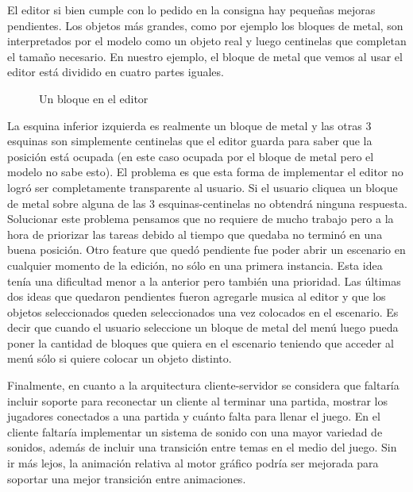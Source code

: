 \documentclass[a4paper]{article}
\begin{document}
El editor si bien cumple con lo pedido en la consigna hay pequeñas mejoras pendientes. Los objetos más grandes, como por ejemplo los bloques de metal, son interpretados por el modelo como un objeto real y luego centinelas que completan el tamaño necesario. En nuestro ejemplo, el bloque de metal que vemos al usar el editor está dividido en cuatro partes iguales.

\begin{figure}[!h]
	\caption{Un bloque en el editor}
	\label{fig:diagrama1}
\end{figure}

La esquina inferior izquierda es realmente un bloque de metal y las otras 3 esquinas son simplemente centinelas que el editor guarda para saber que la posición está ocupada (en este caso ocupada por el bloque de metal pero el modelo no sabe esto). El problema es que esta forma de implementar el editor no logró ser completamente transparente al usuario. Si el usuario cliquea un bloque de metal sobre alguna de las 3 esquinas-centinelas no obtendrá ninguna respuesta. Solucionar este problema pensamos que no requiere de mucho trabajo pero a la hora de priorizar las tareas debido al tiempo que quedaba no terminó en una buena posición. 
Otro feature que quedó pendiente fue poder abrir un escenario en cualquier momento de la edición, no sólo en una primera instancia. Esta idea tenía una dificultad menor a la anterior pero también una prioridad.
Las últimas dos ideas que quedaron pendientes fueron agregarle musica al editor y que los objetos seleccionados queden seleccionados una vez colocados en el escenario. Es decir que cuando el usuario seleccione un bloque de metal del menú luego pueda poner la cantidad de bloques que quiera en el escenario teniendo que acceder al menú sólo si quiere colocar un objeto distinto.

Finalmente, en cuanto a la arquitectura cliente-servidor se considera que faltaría incluir soporte para reconectar un cliente al terminar una partida, mostrar los jugadores conectados a una partida y cuánto falta para llenar el juego. En el cliente faltaría implementar un sistema de sonido con una mayor variedad de sonidos, además de incluir una transición entre temas en el medio del juego. Sin ir más lejos, la animación relativa al motor gráfico podría ser mejorada para soportar una mejor transición entre animaciones.
\end{document}

